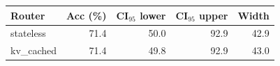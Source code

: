 \begin{tabular}{lrrrr}
\toprule
Router & Acc (\%) & CI$_{95}$ lower & CI$_{95}$ upper & Width \\
\midrule
  stateless & 71.4 & 50.0 & 92.9 & 42.9 \\
  kv_cached & 71.4 & 49.8 & 92.9 & 43.0 \\
\bottomrule
\end{tabular}
